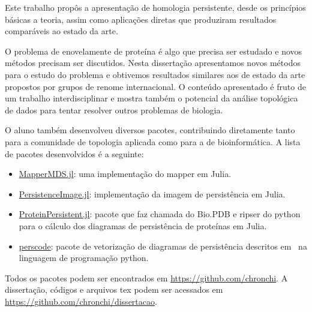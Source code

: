 Este trabalho propôs a apresentação de homologia persistente, desde os princípios
básicas a teoria, assim como aplicações diretas que produziram resultados 
comparáveis ao estado da arte.

O problema de enovelamente de proteína é algo que precisa ser estudado e novos
métodos precisam ser discutidos. Nesta dissertação apresentamos novos métodos
para o estudo do problema e obtivemos resultados similares aos de estado
da arte propostos por grupos de renome internacional. O conteúdo
apresentado é fruto de um trabalho interdisciplinar e mostra também
o potencial da análise topológica de dados para tentar resolver outros
problemas de biologia. 

O aluno também desenvolveu diversos pacotes, contribuindo diretamente tanto
para a comunidade de topologia aplicada como para a de bioinformática.
A lista de pacotes desenvolvidos é a seguinte:
\begin{itemize}
    \item \href{https://github.com/chronchi/MapperMDS.jl}{MapperMDS.jl}: 
        uma implementação do mapper em Julia.
    \item \href{https://github.com/chronchi/PersistenceImage.jl}{PersistenceImage.jl}:
        implementação da imagem de persistência em Julia. 
    \item \href{https://github.com/chronchi/ProteinPersistent.jl}{ProteinPersistent.jl}:
        pacote que faz chamada do Bio.PDB e ripser do python para o cálculo dos diagramas
        de persistência de proteínas em Julia. 
    \item \href{https://github.com/chronchi/perscode}{perscode}: pacote de vetorização
        de diagramas de persistência descritos em~\cite{zielinski2018} na linguagem
        de programação python.
\end{itemize}

Todos os pacotes podem ser encontrados em \url{https://github.com/chronchi}. A dissertação,
códigos e arquivos tex podem ser acessados em \url{https://github.com/chronchi/dissertacao}.
